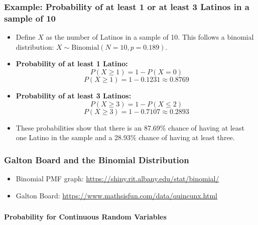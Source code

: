 \documentclass[handout]{beamer} %
\begin{document}
\begin{frame}
\footnotesize
\frametitle{Example: Probability of at least 1 or at least 3 Latinos in a sample of 10}
    \begin{itemize}
        \setlength{\itemsep}{0pt} %
        \item Define \( X \) as the number of Latinos in a sample of 10. This follows a binomial distribution: \( X \sim \text{Binomial}(N=10, p=0.189) \). \pause

        \item \textbf{Probability of at least 1 Latino:} \pause
        \[
        P(X \geq 1) = 1 - P(X = 0)
        \]
        \[
        P(X \geq 1) = 1 - 0.1231 \approx 0.8769
        \]

        \item \textbf{Probability of at least 3 Latinos:} \pause
        \[
        P(X \geq 3) = 1 - P(X \leq 2)
        \]
        \[
        P(X \geq 3) = 1 - 0.7107 \approx 0.2893
        \]

        \item These probabilities show that there is an 87.69\% chance of having at least one Latino in the sample and a 28.93\% chance of having at least three.
    \end{itemize}
\end{frame}


\begin{frame}
\frametitle{Galton Board and the Binomial Distribution}
\begin{itemize}
    \item Binomial PMF graph: \url{https://shiny.rit.albany.edu/stat/binomial/}
    \item Galton Board: \url{https://www.mathsisfun.com/data/quincunx.html}
\end{itemize}
\end{frame}

{
\begin{frame}[noframenumbering]
\frametitle{}
\centering
\vspace*{\fill}
{\color{moonstoneblue!170}\textbf{\Large Probability for Continuous Random Variables}}
\vspace*{\fill}
\end{frame}
}
\end{document}
